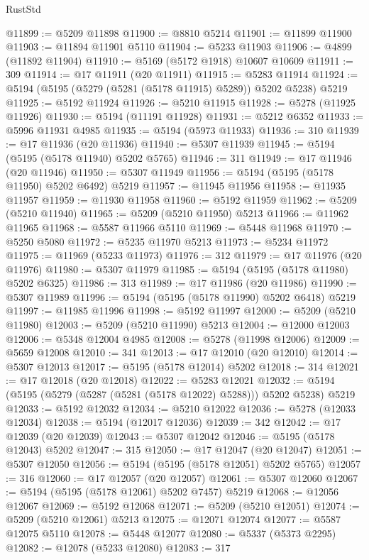 \begin{lexlean}{RustStd}
\begin{coremodule}
@11899 := @5209 @11898
@11900 := @8810 @5214
@11901 := @11899 @11900
@11903 := @11894 @11901 @5110
@11904 := @5233 @11903
@11906 := @4899 (@11892 @11904)
@11910 := @5169 (@5172 @1918) @10607 @10609
@11911 := 309
@11914 := @17 @11911 (@20 @11911)
@11915 := @5283 @11914
@11924 := @5194 (@5195 (@5279 (@5281 (@5178 @11915) @5289)) @5202 @5238) @5219
@11925 := @5192 @11924
@11926 := @5210 @11915
@11928 := @5278 (@11925 @11926)
@11930 := @5194 (@11191 @11928)
@11931 := @5212 @6352
@11933 := @5996 @11931 @4985
@11935 := @5194 (@5973 @11933)
@11936 := 310
@11939 := @17 @11936 (@20 @11936)
@11940 := @5307 @11939
@11945 := @5194 (@5195 (@5178 @11940) @5202 @5765)
@11946 := 311
@11949 := @17 @11946 (@20 @11946)
@11950 := @5307 @11949
@11956 := @5194 (@5195 (@5178 @11950) @5202 @6492) @5219
@11957 := @11945 @11956
@11958 := @11935 @11957
@11959 := @11930 @11958
@11960 := @5192 @11959
@11962 := @5209 (@5210 @11940)
@11965 := @5209 (@5210 @11950) @5213
@11966 := @11962 @11965
@11968 := @5587 @11966 @5110
@11969 := @5448 @11968
@11970 := @5250 @5080
@11972 := @5235 @11970 @5213
@11973 := @5234 @11972
@11975 := @11969 (@5233 @11973)
@11976 := 312
@11979 := @17 @11976 (@20 @11976)
@11980 := @5307 @11979
@11985 := @5194 (@5195 (@5178 @11980) @5202 @6325)
@11986 := 313
@11989 := @17 @11986 (@20 @11986)
@11990 := @5307 @11989
@11996 := @5194 (@5195 (@5178 @11990) @5202 @6418) @5219
@11997 := @11985 @11996
@11998 := @5192 @11997
@12000 := @5209 (@5210 @11980)
@12003 := @5209 (@5210 @11990) @5213
@12004 := @12000 @12003
@12006 := @5348 @12004 @4985
@12008 := @5278 (@11998 @12006)
@12009 := @5659 @12008
@12010 := 341
@12013 := @17 @12010 (@20 @12010)
@12014 := @5307 @12013
@12017 := @5195 (@5178 @12014) @5202
@12018 := 314
@12021 := @17 @12018 (@20 @12018)
@12022 := @5283 @12021
@12032 := @5194 (@5195 (@5279 (@5287 (@5281 (@5178 @12022) @5288))) @5202 @5238) @5219
@12033 := @5192 @12032
@12034 := @5210 @12022
@12036 := @5278 (@12033 @12034)
@12038 := @5194 (@12017 @12036)
@12039 := 342
@12042 := @17 @12039 (@20 @12039)
@12043 := @5307 @12042
@12046 := @5195 (@5178 @12043) @5202
@12047 := 315
@12050 := @17 @12047 (@20 @12047)
@12051 := @5307 @12050
@12056 := @5194 (@5195 (@5178 @12051) @5202 @5765)
@12057 := 316
@12060 := @17 @12057 (@20 @12057)
@12061 := @5307 @12060
@12067 := @5194 (@5195 (@5178 @12061) @5202 @7457) @5219
@12068 := @12056 @12067
@12069 := @5192 @12068
@12071 := @5209 (@5210 @12051)
@12074 := @5209 (@5210 @12061) @5213
@12075 := @12071 @12074
@12077 := @5587 @12075 @5110
@12078 := @5448 @12077
@12080 := @5337 (@5373 @2295)
@12082 := @12078 (@5233 @12080)
@12083 := 317

\end{coremodule}
\end{lexlean}
